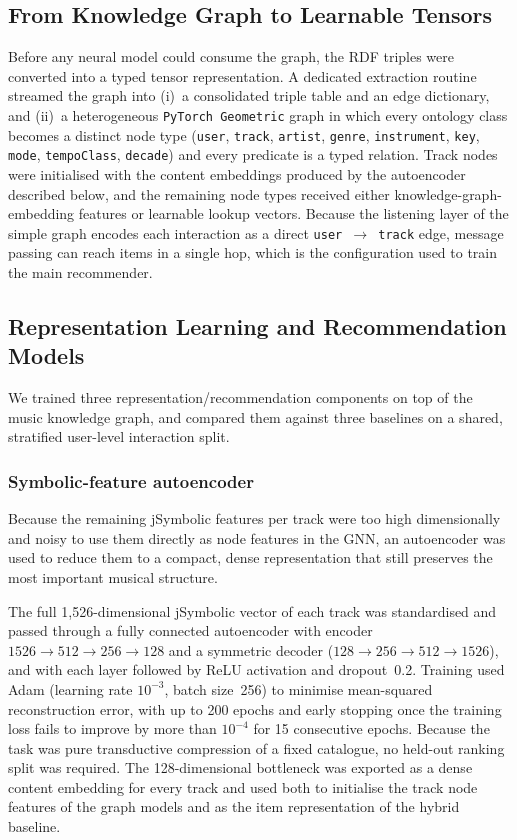 \subsection{From Knowledge Graph to Learnable Tensors}

Before any neural model could consume the graph, the RDF triples were converted
into a typed tensor representation. A dedicated extraction routine streamed the
graph into (i)~a consolidated triple table and an edge dictionary, and
(ii)~a heterogeneous \texttt{PyTorch~Geometric} graph in which every ontology
class becomes a distinct node type (\texttt{user}, \texttt{track},
\texttt{artist}, \texttt{genre}, \texttt{instrument}, \texttt{key},
\texttt{mode}, \texttt{tempoClass}, \texttt{decade}) and every predicate is a
typed relation. Track nodes were initialised with the content embeddings
produced by the autoencoder described below, and the remaining node types received
either knowledge-graph-embedding features or learnable lookup vectors. Because
the listening layer of the simple graph encodes each interaction as a direct
\texttt{user\,$\rightarrow$\,track} edge, message passing can reach items in a
single hop, which is the configuration used to train the main recommender.


\subsection{Representation Learning and Recommendation Models}

We trained three representation/recommendation components on top of the music knowledge graph, and compared them against three baselines on a shared, stratified user-level interaction split.

\subsubsection{Symbolic-feature autoencoder}

Because the remaining jSymbolic features per track were too high dimensionally and noisy to use them directly as node features in the GNN, an autoencoder was used to reduce them to a compact, dense representation that still preserves the most important musical structure.

The full 1{,}526-dimensional jSymbolic vector of each track was standardised and passed through a fully connected autoencoder with encoder $1526\!\rightarrow\!512\!\rightarrow\!256\!\rightarrow\!128$ and a symmetric decoder ($128\!\rightarrow\!256\!\rightarrow\!512\!\rightarrow\!1526$), and with each layer followed by ReLU activation and dropout~0.2. Training used Adam (learning rate $10^{-3}$, batch size~256) to minimise mean-squared reconstruction error, with up to 200 epochs and early stopping once the training loss fails to improve by more than $10^{-4}$ for 15 consecutive epochs. Because the task was pure transductive compression of a fixed catalogue, no held-out ranking split was required. The 128-dimensional bottleneck was exported as a dense content embedding for every track and used both to initialise the track node features of the graph models and as the item representation of the hybrid baseline.

